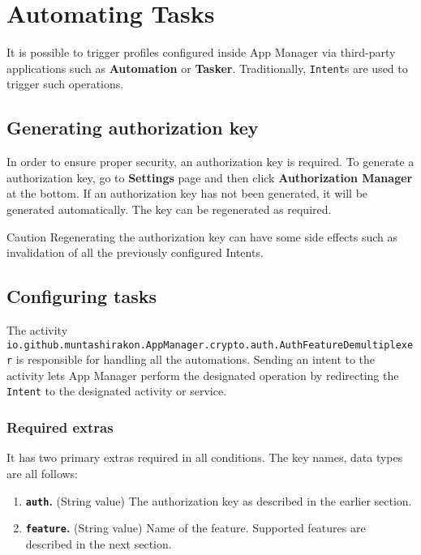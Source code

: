 \section{Automating Tasks}\label{sec:automating-tasks} %
It is possible to trigger profiles configured inside App Manager via third-party applications such as \textbf{Automation} or \textbf{Tasker}.
Traditionally, \texttt{Intent}s are used to trigger such operations.

\subsection{Generating authorization key}\label{subsec:generating-authorization-key} %
In order to ensure proper security, an authorization key is required. To generate a authorization key, go to \textbf{Settings} page and then click \textbf{Authorization Manager} at the bottom.
If an authorization key has not been generated, it will be generated automatically. The key can be regenerated as required.

\begin{danger}{Caution}
    Regenerating the authorization key can have some side effects such as invalidation of all the previously configured Intents.
\end{danger}

\subsection{Configuring tasks}\label{subsec:at:general-configuration} %
The activity \texttt{io.github.muntashirakon.AppManager.crypto.auth.AuthFeatureDemultiplexer} is responsible for handling all the automations.
Sending an intent to the activity lets App Manager perform the designated operation by redirecting the \texttt{Intent} to the designated activity or service.

\subsubsection{Required extras} %
It has two primary extras required in all conditions. The key names, data types are all follows:
\begin{enumerate}
    \item \textbf{\texttt{auth}.} (String value) The authorization key as described in the earlier section.
    \item \textbf{\texttt{feature}.} (String value) Name of the feature. Supported features are described in the next section.
\end{enumerate}

